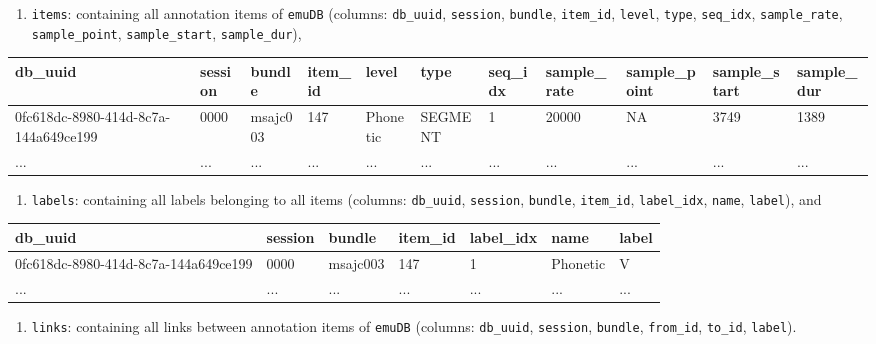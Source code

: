 \documentclass[]{book}
\providecommand{\tightlist}{%
  \setlength{\itemsep}{0pt}\setlength{\parskip}{0pt}}
\theoremstyle{definition}
\theoremstyle{definition}
\theoremstyle{definition}
\theoremstyle{remark}
\begin{document}
\begin{enumerate}
\def\labelenumi{\arabic{enumi}.}
\setcounter{enumi}{3}
\tightlist
\item
  \texttt{items}: containing all annotation items of \texttt{emuDB}
  (columns: \texttt{db\_uuid}, \texttt{session}, \texttt{bundle},
  \texttt{item\_id}, \texttt{level}, \texttt{type}, \texttt{seq\_idx},
  \texttt{sample\_rate}, \texttt{sample\_point}, \texttt{sample\_start},
  \texttt{sample\_dur}),
\end{enumerate}

\begin{tabular}{l|l|l|l|l|l|l|l|l|l|l}
\hline
db\_uuid & session & bundle & item\_id & level & type & seq\_idx & sample\_rate & sample\_point & sample\_start & sample\_dur\\
\hline
0fc618dc-8980-414d-8c7a-144a649ce199 & 0000 & msajc003 & 147 & Phonetic & SEGMENT & 1 & 20000 & NA & 3749 & 1389\\
\hline
... & ... & ... & ... & ... & ... & ... & ... & ... & ... & ...\\
\hline
\end{tabular}

\begin{enumerate}
\def\labelenumi{\arabic{enumi}.}
\setcounter{enumi}{4}
\tightlist
\item
  \texttt{labels}: containing all labels belonging to all items
  (columns: \texttt{db\_uuid}, \texttt{session}, \texttt{bundle},
  \texttt{item\_id}, \texttt{label\_idx}, \texttt{name},
  \texttt{label}), and
\end{enumerate}

\begin{tabular}{l|l|l|l|l|l|l}
\hline
db\_uuid & session & bundle & item\_id & label\_idx & name & label\\
\hline
0fc618dc-8980-414d-8c7a-144a649ce199 & 0000 & msajc003 & 147 & 1 & Phonetic & V\\
\hline
... & ... & ... & ... & ... & ... & ...\\
\hline
\end{tabular}

\begin{enumerate}
\def\labelenumi{\arabic{enumi}.}
\setcounter{enumi}{5}
\tightlist
\item
  \texttt{links}: containing all links between annotation items of
  \texttt{emuDB} (columns: \texttt{db\_uuid}, \texttt{session},
  \texttt{bundle}, \texttt{from\_id}, \texttt{to\_id}, \texttt{label}).
\end{enumerate}
\end{document}
